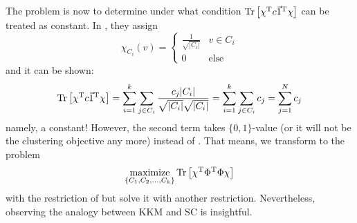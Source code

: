 The problem is now to determine under what condition 
$ \mathrm{Tr}\left[ \chi^\mathrm{T}c\vec{1}^\mathrm{T}\chi \right] $ can be treated 
as constant. In \cite{dhillon2004unified}, they 
assign 
\begin{equation}
    \chi_{C_i}(v) = \left\lbrace \begin{array}{cc}
	\frac{1}{\sqrt{|C_i|}} & v \in C_i \\
	0 & \text{else}
	\end{array} \right. 
	\label{eq:cluster_chi}
\end{equation}
and it can be shown:
\begin{equation}
	\mathrm{Tr}\left[ \chi^\mathrm{T}c\vec{1}^\mathrm{T}\chi \right]
	= \sum_{i=1}^{k}\sum_{j \in C_i}\frac{c_j|C_i|}{\sqrt{|C_i|}\sqrt{|C_i|}}
	= \sum_{i=1}^{k}\sum_{j \in C_i}c_j
	= \sum_{j=1}^{N} c_j
\end{equation}
namely, a constant! However, the second term takes 
$ \{0,1\} $-value
(or it will not be the clustering objective any more)
instead of \req{\ref{eq:cluster_chi}}. 
That means, we transform to the problem
\begin{equation}
	\operatorname*{maximize}_{\{C_1, C_2, \ldots, C_k\}} \mathrm{Tr}\left[ \chi^\mathrm{T}\Phi^\mathrm{T}\Phi \chi\right]
\end{equation}
with the restriction of \req{\ref{eq:cluster_chi}} but 
solve it with another restriction. 
Nevertheless, observing the analogy between 
KKM and SC is insightful. 

